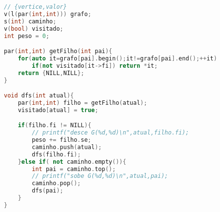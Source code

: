 \begin{lstlisting}[language=C++,title=lista de adjacêncica]
// {vertice,valor}
v(l(par(int,int))) grafo;
s(int) caminho;
v(bool) visitado;
int peso = 0;

par(int,int) getFilho(int pai){
    for(auto it=grafo[pai].begin();it!=grafo[pai].end();++it)
        if(not visitado[it->fi]) return *it;
    return {NILL,NILL};
}

void dfs(int atual){
    par(int,int) filho = getFilho(atual);
    visitado[atual] = true;

    if(filho.fi != NILL){
        // printf("desce G(%d,%d)\n",atual,filho.fi);
        peso += filho.se;
        caminho.push(atual);
        dfs(filho.fi);
    }else if( not caminho.empty()){
        int pai = caminho.top();
        // printf("sobe G(%d,%d)\n",atual,pai);
        caminho.pop();
        dfs(pai);
    }
}
\end{lstlisting}
